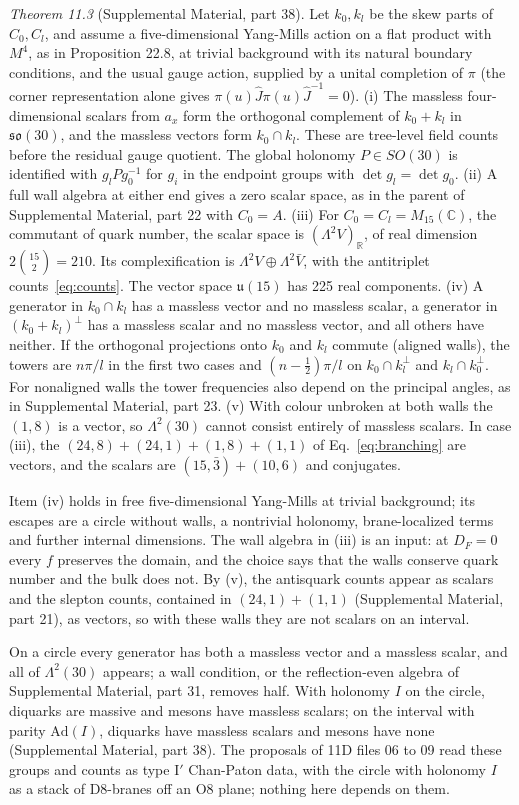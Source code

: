 \documentclass[aps,prd,reprint,onecolumn,nofootinbib,amsmath,amssymb,floatfix]{revtex4-2}
\theoremstyle{plain}
\newcommand{\C}{\mathbb C}
\newcommand{\supp}[1]{Supplemental Material, part #1}
\begin{document}
\smallskip\noindent\textit{Theorem 11.3} (\supp{38}). Let $k_0,k_l$ be the skew parts of $C_0,C_l$, and assume a five-dimensional Yang-Mills action on a flat product with $M^4$, as in Proposition 22.8, at trivial background with its natural boundary conditions, and the usual gauge action, supplied by a unital completion of $\pi$ (the corner representation alone gives $\pi(u)\hat J\pi(u)\hat J^{-1}=0$).
(i) The massless four-dimensional scalars from $a_x$ form the orthogonal complement of $k_0+k_l$ in $\mathfrak{so}(30)$, and the massless vectors form $k_0\cap k_l$. These are tree-level field counts before the residual gauge quotient. The global holonomy $P\in SO(30)$ is identified with $g_lPg_0^{-1}$ for $g_i$ in the endpoint groups with $\det g_l=\det g_0$.
(ii) A full wall algebra at either end gives a zero scalar space, as in the parent of \supp{22} with $C_0=A$.
(iii) For $C_0=C_l=M_{15}(\C)$, the commutant of quark number, the scalar space is $(\Lambda^2V)_{\mathbb R}$, of real dimension $2\binom{15}{2}=210$. Its complexification is $\Lambda^2V\oplus\Lambda^2\bar V$, with the antitriplet counts~\eqref{eq:counts}. The vector space $\mathfrak u(15)$ has 225 real components.
(iv) A generator in $k_0\cap k_l$ has a massless vector and no massless scalar, a generator in $(k_0+k_l)^\perp$ has a massless scalar and no massless vector, and all others have neither. If the orthogonal projections onto $k_0$ and $k_l$ commute (aligned walls), the towers are $n\pi/l$ in the first two cases and $(n-\frac12)\pi/l$ on $k_0\cap k_l^\perp$ and $k_l\cap k_0^\perp$. For nonaligned walls the tower frequencies also depend on the principal angles, as in \supp{23}.
(v) With colour unbroken at both walls the $(1,8)$ is a vector, so $\Lambda^2(30)$ cannot consist entirely of massless scalars. In case (iii), the $(24,8)+(24,1)+(1,8)+(1,1)$ of Eq.~\eqref{eq:branching} are vectors, and the scalars are $(15,\bar3)+(10,6)$ and conjugates.
\smallskip

Item (iv) holds in free five-dimensional Yang-Mills at trivial background; its escapes are a circle without walls, a nontrivial holonomy, brane-localized terms and further internal dimensions. The wall algebra in (iii) is an input: at $D_F=0$ every $f$ preserves the domain, and the choice says that the walls conserve quark number and the bulk does not. By (v), the antisquark counts appear as scalars and the slepton counts, contained in $(24,1)+(1,1)$ (\supp{21}), as vectors, so with these walls they are not scalars on an interval.

On a circle every generator has both a massless vector and a massless scalar, and all of $\Lambda^2(30)$ appears; a wall condition, or the reflection-even algebra of \supp{31}, removes half. With holonomy $I$ on the circle, diquarks are massive and mesons have massless scalars; on the interval with parity $\mathrm{Ad}(I)$, diquarks have massless scalars and mesons have none (\supp{38}). The proposals of 11D files 06 to 09 read these groups and counts as type I$'$ Chan-Paton data, with the circle with holonomy $I$ as a stack of D8-branes off an O8 plane; nothing here depends on them.
\end{document}

